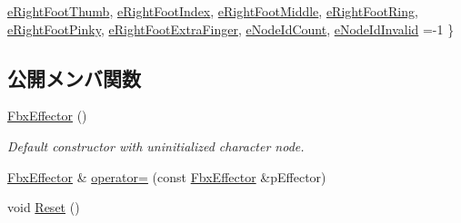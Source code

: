 \begin{DoxyCompactItemize}
\hyperlink{class_fbx_effector_a26afd81fd3d41431311004c16536e739a805dc5bb13992cd01f03b8c50cd314f7}{e\+Right\+Foot\+Thumb}, 
\hyperlink{class_fbx_effector_a26afd81fd3d41431311004c16536e739aeb59105aa759787508c28c073a134ca4}{e\+Right\+Foot\+Index}, 
\newline
\hyperlink{class_fbx_effector_a26afd81fd3d41431311004c16536e739aa88cfdaa216c26037c7b86d317a3ad00}{e\+Right\+Foot\+Middle}, 
\hyperlink{class_fbx_effector_a26afd81fd3d41431311004c16536e739a2012e0a3430f475b895060752d89646a}{e\+Right\+Foot\+Ring}, 
\hyperlink{class_fbx_effector_a26afd81fd3d41431311004c16536e739adf3fbb5910c7d01821ba5ddf169c7dce}{e\+Right\+Foot\+Pinky}, 
\hyperlink{class_fbx_effector_a26afd81fd3d41431311004c16536e739a1804f75144f3155775ca643156fca371}{e\+Right\+Foot\+Extra\+Finger}, 
\newline
\hyperlink{class_fbx_effector_a26afd81fd3d41431311004c16536e739ac77c47b9befbabfa50286f35df67d70f}{e\+Node\+Id\+Count}, 
\hyperlink{class_fbx_effector_a26afd81fd3d41431311004c16536e739afd54cc03367f3c7365e394b009b75cf4}{e\+Node\+Id\+Invalid} =-\/1
 \}
\end{DoxyCompactItemize}
\subsection*{公開メンバ関数}
\begin{DoxyCompactItemize}
\item 
\hyperlink{class_fbx_effector_affc3f712648fd0a776886da83e562170}{Fbx\+Effector} ()
\begin{DoxyCompactList}\small\item\em Default constructor with uninitialized character node. \end{DoxyCompactList}\item 
\hyperlink{class_fbx_effector}{Fbx\+Effector} \& \hyperlink{class_fbx_effector_ac4d56e55ec719e7a8e20ac56df22ad0a}{operator=} (const \hyperlink{class_fbx_effector}{Fbx\+Effector} \&p\+Effector)
\item 
void \hyperlink{class_fbx_effector_a9361ed2afd2c90fd0a74d81467205749}{Reset} ()
\end{DoxyCompactItemize}
